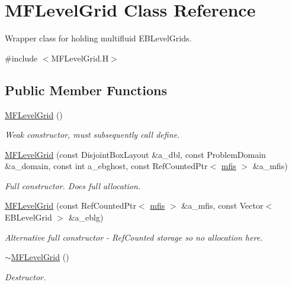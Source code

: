 \hypertarget{classMFLevelGrid}{}\section{M\+F\+Level\+Grid Class Reference}
\label{classMFLevelGrid}


Wrapper class for holding multifluid E\+B\+Level\+Grids.  




{\ttfamily \#include $<$M\+F\+Level\+Grid.\+H$>$}

\subsection*{Public Member Functions}
\begin{DoxyCompactItemize}
\item 
\hyperlink{classMFLevelGrid_a922574db896fe47e94ba202590807c5e}{M\+F\+Level\+Grid} ()
\begin{DoxyCompactList}\small\item\em Weak constructor, must subsequently call define. \end{DoxyCompactList}\item 
\hyperlink{classMFLevelGrid_a9a72139bdf5df512aded6478ab67af3d}{M\+F\+Level\+Grid} (const Disjoint\+Box\+Layout \&a\+\_\+dbl, const Problem\+Domain \&a\+\_\+domain, const int a\+\_\+ebghost, const Ref\+Counted\+Ptr$<$ \hyperlink{classmfis}{mfis} $>$ \&a\+\_\+mfis)
\begin{DoxyCompactList}\small\item\em Full constructor. Does full allocation. \end{DoxyCompactList}\item 
\hyperlink{classMFLevelGrid_a7301906465ddf8e2319c5dbc38e4eb1d}{M\+F\+Level\+Grid} (const Ref\+Counted\+Ptr$<$ \hyperlink{classmfis}{mfis} $>$ \&a\+\_\+mfis, const Vector$<$ E\+B\+Level\+Grid $>$ \&a\+\_\+eblg)
\begin{DoxyCompactList}\small\item\em Alternative full constructor -\/ Ref\+Counted storage so no allocation here. \end{DoxyCompactList}\item 
\hyperlink{classMFLevelGrid_aab55f4793d3f2ca0ab94c1527d96769f}{$\sim$\+M\+F\+Level\+Grid} ()
\begin{DoxyCompactList}\small\item\em Destructor. \end{DoxyCompactList}\item 

\end{DoxyCompactItemize}
